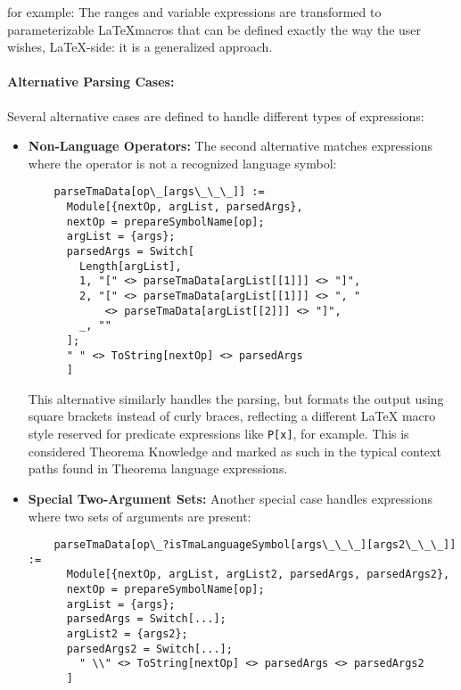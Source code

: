 for example: The ranges and variable expressions are transformed to parameterizable \LaTeX macros that can be defined exactly the way the user wishes, \LaTeX-side: it is a generalized approach.

\paragraph{Alternative Parsing Cases:}

Several alternative cases are defined to handle different types of expressions:

\begin{itemize}
    \item \textbf{Non-Language Operators:} The second alternative matches expressions where the operator is not a recognized language symbol:

    \begin{verbatim}
    parseTmaData[op\_[args\_\_\_]] := 
      Module[{nextOp, argList, parsedArgs}, 
      nextOp = prepareSymbolName[op]; 
      argList = {args}; 
      parsedArgs = Switch[
        Length[argList], 
        1, "[" <> parseTmaData[argList[[1]]] <> "]", 
        2, "[" <> parseTmaData[argList[[1]]] <> ", " 
            <> parseTmaData[argList[[2]]] <> "]", 
        _, ""
      ]; 
      " " <> ToString[nextOp] <> parsedArgs
      ]
    \end{verbatim}

    This alternative similarly handles the parsing, but formats the output using square brackets instead of curly braces, reflecting a different LaTeX macro style reserved for predicate expressions like \lstinline+P[x]+, for example. This is considered Theorema Knowledge and marked as such in the typical context paths found in Theorema language expressions.

    \item \textbf{Special Two-Argument Sets:} Another special case handles expressions where two sets of arguments are present:

    \begin{verbatim}
    parseTmaData[op\_?isTmaLanguageSymbol[args\_\_\_][args2\_\_\_]] := 
      Module[{nextOp, argList, argList2, parsedArgs, parsedArgs2}, 
      nextOp = prepareSymbolName[op]; 
      argList = {args}; 
      parsedArgs = Switch[...];
      argList2 = {args2}; 
      parsedArgs2 = Switch[...]; 
        " \\" <> ToString[nextOp] <> parsedArgs <> parsedArgs2
      ]
    \end{verbatim}


\end{itemize}
